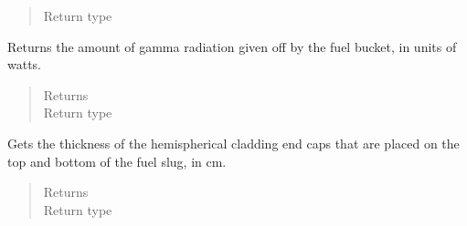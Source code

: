 \documentclass[letterpaper,10pt,openany,oneside,english]{sphinxmanual}
\begin{document}
\begin{fulllineitems}
\begin{fulllineitems}
\begin{quote}
\begin{description}
\item[{Return type}] \leavevmode
{}

\end{description}\end{quote}

\end{fulllineitems}


\begin{fulllineitems}
\label{\detokenize{support_rst/fuel_bucket:fuel_bucket.FuelBucket.gamma_pwr}}
Returns the amount of gamma radiation given off by the fuel bucket,
in units of watts.
\begin{quote}\begin{description}
\item[{Returns}] \leavevmode
{}

\item[{Return type}] \leavevmode
{}

\end{description}\end{quote}

\end{fulllineitems}


\begin{fulllineitems}
\label{\detokenize{support_rst/fuel_bucket:fuel_bucket.FuelBucket.get_cladding_end_thickness}}
Gets the thickness of the hemispherical cladding end caps that are
placed on the top and bottom of the fuel slug, in cm.
\begin{quote}\begin{description}
\item[{Returns}] \leavevmode
{}

\item[{Return type}] \leavevmode
{}

\end{description}\end{quote}


\end{fulllineitems}
\end{fulllineitems}
\end{document}
